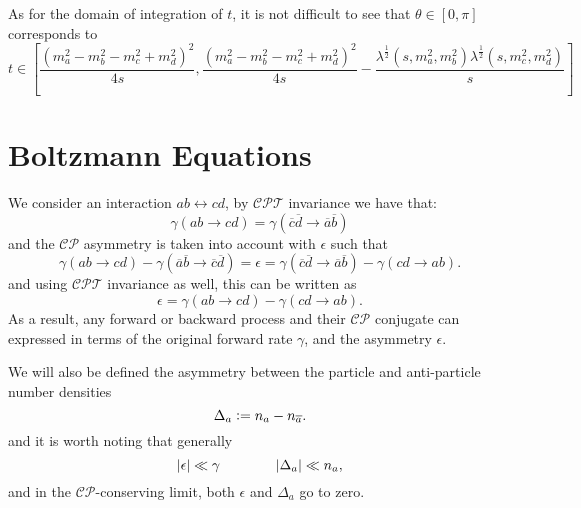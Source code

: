 \documentclass{scrartcl}
\begin{document}
As for the domain of integration of \(t\), it is not difficult to see that
\(\theta \in [0, \pi]\) corresponds to
\begin{equation}
  t \in \left[
    \frac{\left( m_a^2 - m_b^2 - m_c^2 + m_d^2 \right)^2}{4 s},
    \frac{\left( m_a^2 - m_b^2 - m_c^2 + m_d^2 \right)^2}{4 s}
    - \frac{\lambda^{\frac{1}{2}}(s, m_a^2, m_b^2) \lambda^{\frac{1}{2}}(s, m_c^2, m_d^2)}{s}
    \right]
\end{equation}

\section{Boltzmann Equations}%
\label{sec:boltzmann_equation}

We consider an interaction \(ab \leftrightarrow cd\), by \(\mathcal{CPT}\)
invariance we have that:
\begin{equation}
  \gamma(ab \to cd) = \gamma(\overline{c} \overline{d} \to \overline{a} \overline{b})
\end{equation}
and the \(\mathcal{CP}\) asymmetry is taken into account with \(\epsilon\) such
that
\begin{equation}
  \gamma(ab \to cd) - \gamma(\overline{a} \overline{b} \to \overline{c} \overline{d})
  = \epsilon
  = \gamma(\overline{c} \overline{d} \to \overline{a} \overline{b}) - \gamma(cd \to ab).
\end{equation}
and using \(\mathcal{CPT}\) invariance as well, this can be written as
\begin{equation}
  \epsilon = \gamma(ab \to cd) - \gamma(cd \to ab).
\end{equation}
As a result, any forward or backward process and their \(\mathcal{CP}\)
conjugate can expressed in terms of the original forward rate \(\gamma\), and
the asymmetry \(\epsilon\).

We will also be defined the asymmetry between the particle and anti-particle
number densities
\begin{equation}
  \Delta_a \vcentcolon= n_a - n_{\overline a}.
\end{equation}
and it is worth noting that generally
\begin{equation}
  \lvert\epsilon\rvert \ll \gamma \qquad\qquad \lvert\Delta_a\rvert \ll n_a,
\end{equation}
and in the \(\mathcal{CP}\)-conserving limit, both \(\epsilon\) and \(\Delta_a\)
go to zero.
\end{document}

